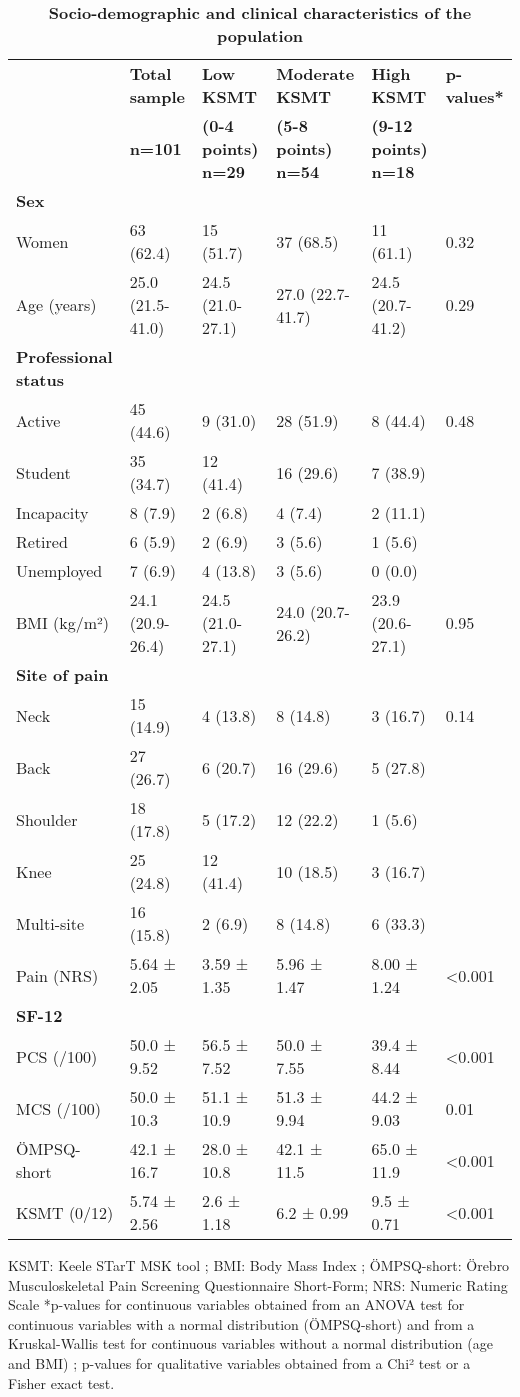 \begin{table*}[htbp]
\caption{\bf Socio-demographic and clinical characteristics of the population}
\begin{tabularx}{\textwidth}{XXXXXX}
\hline
&\textbf{Total sample} & \textbf{Low KSMT} & \textbf{Moderate KSMT} & \textbf{High KSMT} & \textbf{p-values*} \\
&\textbf{n=101} & \textbf{(0-4 points) n=29} & \textbf{(5-8 points) n=54} & \textbf{(9-12 points) n=18}&\\
\hline
\textbf{Sex} \\
Women & 63 (62.4)& 15 (51.7) & 37 (68.5) & 11 (61.1) & 0.32 \\
Age (years) & 25.0 (21.5-41.0) & 24.5 (21.0-27.1) & 27.0 (22.7-41.7) & 24.5 (20.7-41.2) & 0.29 \\
\textbf{Professional status} \\
Active & 45 (44.6) & 9 (31.0) & 28 (51.9)  & 8 (44.4) & 0.48 \\
Student  & 35 (34.7) & 12 (41.4) & 16 (29.6) & 7 (38.9) & \\
Incapacity & 8 (7.9) & 2 (6.8) & 4 (7.4) & 2 (11.1) & \\
Retired & 6 (5.9) & 2 (6.9) & 3 (5.6) & 1 (5.6) & \\
Unemployed & 7 (6.9) & 4 (13.8) & 3 (5.6) & 0 (0.0) & \\
BMI (kg/m²) & 24.1 (20.9-26.4) & 24.5 (21.0-27.1) & 24.0 (20.7-26.2) & 23.9 (20.6-27.1) & 0.95\\
\textbf{Site of pain} \\
Neck & 15 (14.9) & 4 (13.8) & 8 (14.8) & 3 (16.7) & 0.14\\
Back & 27 (26.7) & 6 (20.7) & 16 (29.6) & 5 (27.8) & \\
Shoulder & 18 (17.8) & 5 (17.2) & 12 (22.2) & 1 (5.6) \\
Knee & 25 (24.8) & 12 (41.4) & 10 (18.5) & 3 (16.7) &\\
Multi-site & 16 (15.8) & 2 (6.9) & 8 (14.8) & 6 (33.3) &\\
Pain (NRS) & 5.64 ± 2.05 & 3.59 ± 1.35  & 5.96 ± 1.47 & 8.00 ± 1.24 & <0.001 \\
\textbf{SF-12} \\
PCS (/100) & 50.0 ± 9.52 & 56.5 ± 7.52 & 50.0 ± 7.55 & 39.4 ± 8.44 & <0.001\\
MCS (/100) & 50.0 ± 10.3 & 51.1 ± 10.9 & 51.3 ± 9.94 & 44.2 ± 9.03 & 0.01\\
ÖMPSQ-short & 42.1 ± 16.7 & 28.0 ± 10.8 & 42.1 ± 11.5 & 65.0 ± 11.9 & <0.001 \\
KSMT (0/12) & 5.74 ± 2.56 & 2.6 ± 1.18 & 6.2 ± 0.99 & 9.5 ± 0.71 & <0.001\\
\hline
\end{tabularx}
KSMT: Keele STarT MSK tool ; BMI: Body Mass Index ; ÖMPSQ-short: Örebro Musculoskeletal Pain Screening Questionnaire Short-Form; NRS: Numeric Rating Scale 
*p-values for continuous variables obtained from an ANOVA test for continuous variables with a normal distribution (ÖMPSQ-short) and from a Kruskal-Wallis test for continuous variables without a normal distribution (age and BMI) ; p-values for qualitative variables obtained from a Chi² test or a Fisher exact test.
\end{table*}


